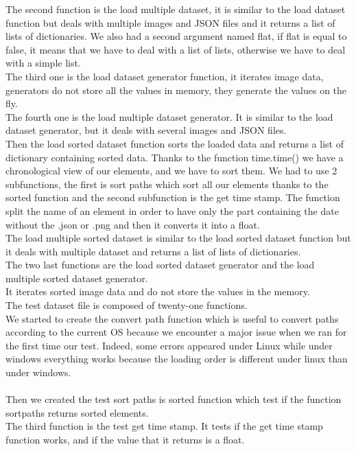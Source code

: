 \documentclass[12pt]{article}
\begin{document}
The second function is the load multiple dataset, it is similar to the load dataset function but deals with multiple images and JSON files and it returns a list of lists of dictionaries.  We also had a second argument named flat, if flat is equal to false, it means that we have to deal with a list of lists, otherwise we have to deal with a simple list.\\ 
The third one is the load dataset generator function, it iterates image data, generators do not store all the values in memory, they generate the values on the fly.\\ 
The fourth one is the load multiple dataset generator. It is similar to the load dataset generator, but it deals with several images and JSON files.\\ 
Then the load sorted dataset function sorts the loaded data and returns a list of dictionary containing sorted data. Thanks to the function time.time() we have a chronological view of our elements, and we have to sort them. We had to use 2 subfunctions, the first is sort paths which sort all our elements thanks to the sorted function and the second subfunction is the get time stamp. The function split the name of an element in order to have only the part containing the date without the .json or .png and then it converts it into a float.\\ 
The load multiple sorted dataset is similar to the load sorted dataset function but it deals with multiple dataset and returns a list of lists of dictionaries.\\ 
The two last functions are the load sorted dataset generator and the load multiple sorted dataset generator.\\ 
It iterates sorted image data and do not store the values in the memory.\\ 
The test dataset file is composed of twenty-one functions.\\ 
We started to create the convert path function which is useful to convert paths according to the current OS because we encounter a major issue when we ran for the first time our test. Indeed, some errors appeared under Linux while under windows everything works because the loading order is different under linux than under windows.\\ \\ 
Then we created the test sort paths is sorted function which test if the function sortpaths returns sorted elements. \\ 
The third function is the test get time stamp. It tests if the get time stamp function works, and if the value that it returns is a float. \\ 
\end{document}

